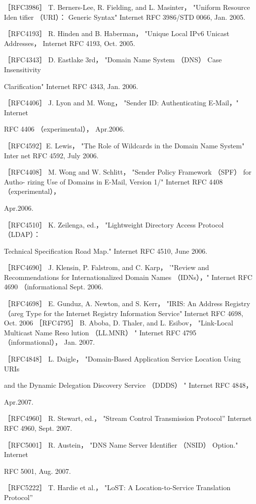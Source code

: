 ［RFC3986］ T. Berners-Lee, R. Fielding, and L. Masinter， "Uniform Resource Iden
tifier （URI）： Generic Syntax" Internet RFC 3986/STD 0066, Jan. 2005.

［RFC4193］ R. Hinden and B. Haberman， "Unique Local IPv6 Unicast Addresses，
Internet RFC 4193, Oct. 2005.

［RFC4343］ D. Eastlake 3rd， "Domain Name System （DNS） Case Insensitivity

Clarification" Internet RFC 4343, Jan. 2006.

［RFC4406］ J. Lyon and M. Wong， "Sender ID: Authenticating E-Mail，" Internet

RFC 4406 （experimental）， Apr.2006.

［RFC4592］E. Lewis， "The Role of Wildcards in the Domain Name System" Inter
net RFC 4592, July 2006.

［RFC4408］ M. Wong and W. Schlitt， "Sender Policy Framework （SPF） for Autho-
rizing Use of Domains in E-Mail, Version 1/" Internet RFC 4408 （experimental），

Apr.2006.

［RFC4510］ K. Zeilenga, ed.， "Lightweight Directory Access Protocol （LDAP）：

Technical Specification Road Map." Internet RFC 4510, June 2006.

［RFC4690］ J. Klensin, P. Falstrom, and C. Karp， '"Review and Recommendations
for Internationalized Domain Names （IDNs），" Internet RFC 4690 （informational
Sept. 2006.

［RFC4698］ E. Gunduz, A. Newton, and S. Kerr， "IRIS: An Address Registry （areg
Type for the Internet Registry Information Service" Internet RFC 4698, Oct. 2006
［RFC4795］ B. Aboba, D. Thaler, and L. Esibov， "Link-Local Multicast Name Reso
lution （LL.MNR） " Internet RFC 4795 （informational）， Jan. 2007.

［RFC4848］ L. Daigle， "Domain-Based Application Service Location Using URIs

and the Dynamic Delegation Discovery Service （DDDS） " Internet RFC 4848，

Apr.2007.

［RFC4960］ R. Stewart, ed.， "Stream Control Transmission Protocol” Internet RFC
4960, Sept. 2007.

［RFC5001］ R. Austein， "DNS Name Server Identifier （NSID） Option." Internet

RFC 5001, Aug. 2007.

［RFC5222］ T. Hardie et al.， "LoST: A Location-to-Service Translation Protocol”

